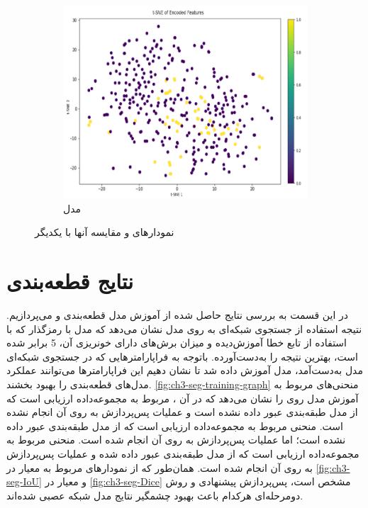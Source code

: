 \begin{figure}[h!]
\begin{subfigure}{0.33\textwidth}
			\includegraphics[width=\linewidth]{Images/Chapter3/tsne-other.png}
			\caption{مدل  
			\cite{Ganeshkumar2022Identification}}
			\label{fig:ch3-tsne-other}
        \end{subfigure}
		\caption{نمودارهای 
		و مقایسه آنها با یکدیگر}
		\label{fig:ch3-tsne}
\end{figure}


\section{نتایج قطعه‌بندی}
در این قسمت به بررسی نتایج حاصل شده از آموزش مدل قطعه‌بندی 
و 
 می‌پردازیم. نتیجه استفاده از جستجوی شبکه‌ای به روی مدل 
 نشان می‌دهد که مدل با رمزگذار 
که با استفاده از تابع خطا
آموزش‌دیده و میزان برش‌های دارای خونریزی آن، 5 برابر شده است، بهترین نتیجه را به‌دست‌آورده‌. باتوجه به فراپارامتر‌هایی که در جستجوی شبکه‌ای مدل
 به‌دست‌آمد، مدل
 آموزش داده شد تا نشان دهیم این فراپارامترها می‌توانند عملکرد مدل‌های قطعه‌بندی را بهبود بخشند. 
 \autoref{fig:ch3-seg-training-graph}
 منحنی‌های مربوط به آموزش مدل روی 
را نشان می‌دهد که در آن 
 ،
 مربوط به مجموعه‌داده ارزیابی است که از مدل طبقه‌بندی عبور داده نشده است و عملیات پس‌پردازش به روی آن انجام نشده است.
 منحنی 
 مربوط به مجموعه‌داده ارزیابی است که از مدل طبقه‌بندی عبور داده نشده‌ است؛ اما عملیات پس‌پردازش به روی آن انجام شده است.
منحنی 
 مربوط به مجموعه‌داده ارزیابی است که از مدل طبقه‌بندی عبور داده شده و عملیات پس‌پردازش به روی آن انجام شده است.
 همان‌طور که از نمودارهای مربوط به معیار
 در 
 \autoref{fig:ch3-seg-IoU}
 و معیار 
  در 
  \autoref{fig:ch3-seg-Dice}
  مشخص است،‌ پس‌پردازش پیشنهادی و روش دومرحله‌ای هرکدام باعث بهبود چشمگیر نتایج مدل شبکه عصبی شده‌اند.
 
